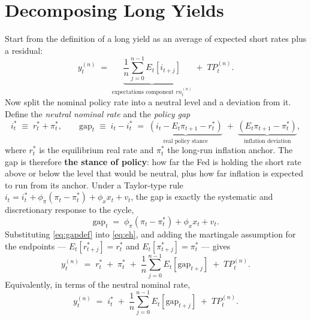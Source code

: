 \documentclass[11pt]{article}
\begin{document}
\section{Decomposing Long Yields}
Start from the definition of a long yield as an average of expected short rates plus a
residual:
\begin{equation}
y^{(n)}_t \;=\; \underbrace{\frac{1}{n}\sum_{j=0}^{n-1} E_t\!\left[i_{t+j}\right]}_{\text{expectations component } rn^{(n)}_t} \;+\; TP^{(n)}_t .
\label{eq:eh}
\end{equation}
Now split the nominal policy rate into a neutral level and a deviation from it. Define the
\emph{neutral nominal rate} and the \emph{policy gap}
\begin{equation}
i^{*}_t \;\equiv\; r^{*}_t + \pi^{*}_t ,
\qquad
\text{gap}_t \;\equiv\; i_t - i^{*}_t \;=\; \underbrace{\left(i_t - E_t\pi_{t+1} - r^{*}_t\right)}_{\text{real policy stance}} \;+\; \underbrace{\left(E_t\pi_{t+1} - \pi^{*}_t\right)}_{\text{inflation deviation}} ,
\label{eq:gapdef}
\end{equation}
where $r^{*}_t$ is the equilibrium real rate and $\pi^{*}_t$ the long-run inflation
anchor. The gap is therefore \textbf{the stance of policy}: how far the Fed is holding the
short rate above or below the level that would be neutral, plus how far inflation is
expected to run from its anchor. Under a Taylor-type rule
$i_t = i^{*}_t + \phi_\pi(\pi_t-\pi^{*}_t) + \phi_x x_t + v_t$, the gap is exactly the
systematic and discretionary response to the cycle,
\begin{equation}
\text{gap}_t \;=\; \phi_\pi\!\left(\pi_t-\pi^{*}_t\right) + \phi_x x_t + v_t .
\label{eq:taylor}
\end{equation}
Substituting \eqref{eq:gapdef} into \eqref{eq:eh}, and adding the martingale assumption for
the endpoints --- $E_t[r^{*}_{t+j}]=r^{*}_t$ and $E_t[\pi^{*}_{t+j}]=\pi^{*}_t$ --- gives
\begin{equation}
y^{(n)}_t \;=\; r^{*}_t \;+\; \pi^{*}_t \;+\; \frac{1}{n}\sum_{j=0}^{n-1} E_t\!\left[\text{gap}_{t+j}\right] \;+\; TP^{(n)}_t .
\label{eq:identity}
\end{equation}
Equivalently, in terms of the neutral nominal rate,
\begin{equation}
y^{(n)}_t \;=\; i^{*}_t \;+\; \frac{1}{n}\sum_{j=0}^{n-1} E_t\!\left[\text{gap}_{t+j}\right] \;+\; TP^{(n)}_t .
\label{eq:identity-istar}
\end{equation}
\end{document}
